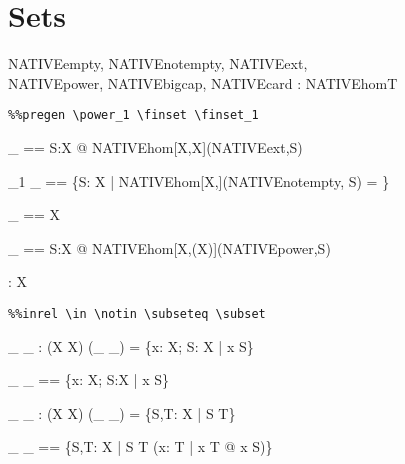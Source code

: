 \documentclass{article}
\begin{document}
\section{Sets}


\begin{axdef}
  NATIVEempty, NATIVEnotempty, NATIVEext,\\
  NATIVEpower, NATIVEbigcap, NATIVEcard : NATIVEhomT
\end{axdef}

\begin{verbatim}
%%pregen \power_1 \finset \finset_1 
\end{verbatim}




\begin{axdef}[X]
  \EXT \_ == \lambda S:\power X @ NATIVEhom[X,\power X](NATIVEext,S)
\end{axdef}

\begin{axdef}[X]
  \power_1 \_ == 
     \{S: \assumed \power X | 
          NATIVEhom[X,\zbool](NATIVEnotempty, S) = \ztrue\}
\end{axdef}

\begin{axdef}[X]
  \finset \_ == \power X
\end{axdef}

\begin{axdef}[X]
  \efinset \_ == \lambda S:\power X @ 
         NATIVEhom[X,\power (\power X)](NATIVEpower,S)
\end{axdef}



\begin{axdef}[X]
  \emptyset: \power X
\end{axdef}



\begin{verbatim}
%%inrel \in \notin \subseteq \subset
\end{verbatim}

\begin{axdef}[X]
   \_ \in \_ : \assumed \power(X \cross \power X)
\where
  (\_ \in \_) = \{x: \assumed X; S: \assumed \power X | x \in S\}
\end{axdef}
\begin{axdef}[X]
   \_ \notin \_ == \{x: \assumed X; S:\assumed \power X | \lnot x \in S\}
\end{axdef}
\begin{axdef}[X]
   \_ \subseteq \_ : \assumed \power(\power X \cross \power X)
\where
   (\_ \subseteq \_) = \{S,T: \assumed \power X | S \subseteq T\}
\end{axdef}
\begin{axdef}[X]
   \_ \subset \_ == \{S,T: \assumed \power X | S \subseteq T \land 
                         (\exists x: \assumed T | x \in T @ \lnot x \in S)\}
\end{axdef}
\end{document}
